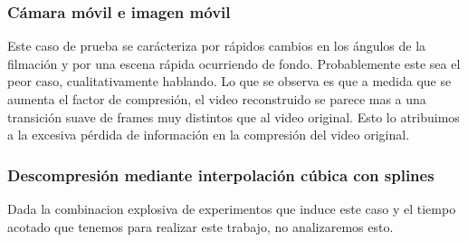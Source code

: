 \subsubsection*{Cámara móvil e imagen móvil}
Este caso de prueba se carácteriza por rápidos cambios en los ángulos de la filmación y por una escena rápida ocurriendo de fondo. Probablemente este sea el peor caso, cualitativamente hablando. Lo que se observa es que a medida que se aumenta el factor de compresión, el video reconstruido se parece mas a una transición suave de frames muy distintos que al video original. Esto lo atribuimos a la excesiva pérdida de información en la compresión del video original. 

\subsubsection{\bf{Descompresión mediante interpolación cúbica con splines}}
Dada la combinacion explosiva de experimentos que induce este caso y el tiempo acotado que tenemos para realizar este trabajo, no analizaremos esto.


